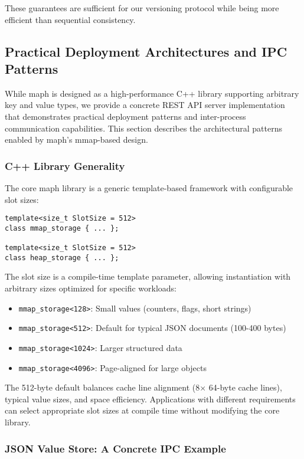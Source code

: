\documentclass[10pt,conference]{IEEEtran}
\begin{document}
These guarantees are sufficient for our versioning protocol while being more efficient than sequential consistency.

\subsection{Practical Deployment Architectures and IPC Patterns}

While maph is designed as a high-performance C++ library supporting arbitrary key and value types, we provide a concrete REST API server implementation that demonstrates practical deployment patterns and inter-process communication capabilities. This section describes the architectural patterns enabled by maph's mmap-based design.

\subsubsection{C++ Library Generality}

The core maph library is a generic template-based framework with configurable slot sizes:
\begin{lstlisting}
template<size_t SlotSize = 512>
class mmap_storage { ... };

template<size_t SlotSize = 512>
class heap_storage { ... };
\end{lstlisting}

The slot size is a compile-time template parameter, allowing instantiation with arbitrary sizes optimized for specific workloads:
\begin{itemize}
\item \texttt{mmap\_storage<128>}: Small values (counters, flags, short strings)
\item \texttt{mmap\_storage<512>}: Default for typical JSON documents (100-400 bytes)
\item \texttt{mmap\_storage<1024>}: Larger structured data
\item \texttt{mmap\_storage<4096>}: Page-aligned for large objects
\end{itemize}

The 512-byte default balances cache line alignment (8$\times$ 64-byte cache lines), typical value sizes, and space efficiency. Applications with different requirements can select appropriate slot sizes at compile time without modifying the core library.

\subsubsection{JSON Value Store: A Concrete IPC Example}
\end{document}
